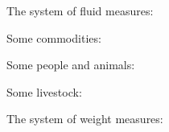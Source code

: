 \documentclass{article}
\begin{document}
\newcommand{\fluids}{\BPvola\ \BPvolb\ \BPvolcd\ \BPvolcf}
The system of fluid measures: \textlinb{\fluids} 

\newcommand{\commodities}{\BPcloth\ \BPwool\ \BPwheat\ \BPbarley\
                         \BPwine\ \BPolive\ \BPbronze\ \BPgold}
Some commodities: \textlinb{\commodities} 

\newcommand{\menhorses}{\BPman\ \BPwoman\ \BPhorse\ \BPfoal}
Some people and animals: \textlinb{\menhorses}  

\newcommand{\livestock}{\BPpig\ \BPboar\ \BPsow\
                        \BPox\ \BPbull\ \BPcow\
                        \BPsheep\ \BPram\ \BPewe\
                        \BPgoat\ \BPbilly\ \BPnanny}
Some livestock: \textlinb{\livestock}  
                         
                             \newcommand{\weights}{\BPwta\ \BPwtb\ \BPwtc\ \BPwtd\ \BPtalent}
The system of weight measures: \textlinb{\weights} 
                         


    
\end{document}
